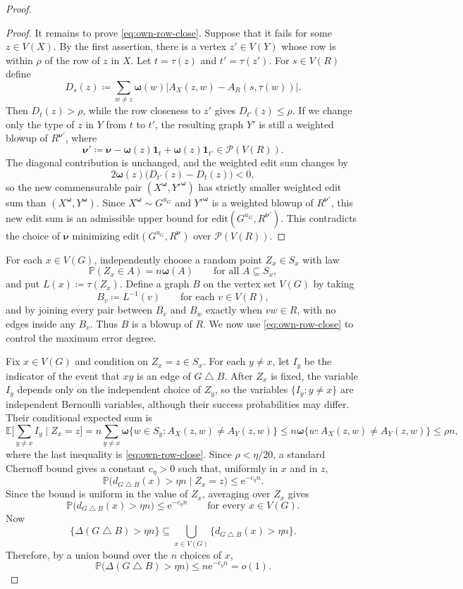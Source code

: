 \documentclass[10pt]{article}
\theoremstyle{plain}
\theoremstyle{remark}
\newcommand{\symdiff}{\mathbin{\triangle}}
\newcommand{\bnu}{{\boldsymbol{\nu}}}
\newcommand{\bomega}{{\boldsymbol{\omega}}}
\begin{document}
\begin{proof}
\begin{proof}
It remains to prove \eqref{eq:own-row-close}. Suppose that it fails for some $z\in V(X)$. By the first assertion, there is a vertex $z'\in V(Y)$ whose row is within $\rho$ of the row of $z$ in $X$. Let $t=\tau(z)$ and $t'=\tau(z')$. For $s\in V(R)$ define
\[
        D_s(z)\coloneqq
        \sum_{w\ne z}\bomega(w)\left|A_X(z,w)-A_R(s,\tau(w))\right|.
\]
Then $D_t(z)>\rho$, while the row closeness to $z'$ gives $D_{t'}(z)\le\rho$. If we change only the type of $z$ in $Y$ from $t$ to $t'$, the resulting graph $Y'$ is still a weighted blowup of $R^{\bnu'}$, where
\[
        \bnu'\coloneqq \bnu-\bomega(z)\mathbf 1_t+\bomega(z)\mathbf 1_{t'}\in\mathcal P(V(R)).
\]
The diagonal contribution is unchanged, and the weighted edit sum changes by
\[
        2\bomega(z)\bigl(D_{t'}(z)-D_t(z)\bigr)<0,
\]
so the new commensurable pair $(X^\bomega,Y'^\bomega)$ has strictly smaller weighted edit sum than $(X^\bomega,Y^\bomega)$. Since $X^\bomega\sim G^{u_G}$ and $Y'^\bomega$ is a weighted blowup of $R^{\bnu'}$, this new edit sum is an admissible upper bound for $\mathrm{edit}(G^{u_G},R^{\bnu'})$. This contradicts the choice of $\bnu$ minimizing $\mathrm{edit}(G^{u_G},R^\bnu)$ over $\mathcal P(V(R))$.
\end{proof}

For each $x\in V(G)$, independently choose a random point $Z_x\in S_x$ with law
\[
        \mathbb P(Z_x\in A)=n\bomega(A)\qquad\text{for all }A\subseteq S_x,
	\]
and put $L(x)\coloneqq\tau(Z_x)$. Define a graph $B$ on the vertex set $V(G)$ by taking
\[
        B_v\coloneqq L^{-1}(v)\qquad\text{for each }v\in V(R),
\]
and by joining every pair between $B_v$ and $B_w$ exactly when $vw\in R$, with no edges inside any $B_v$. Thus $B$ is a blowup of $R$. We now use \eqref{eq:own-row-close} to control the maximum error degree.

Fix $x\in V(G)$ and condition on $Z_x=z\in S_x$. For each $y\ne x$, let $I_y$ be the indicator of the event that $xy$ is an edge of $G\symdiff B$. After $Z_x$ is fixed, the variable $I_y$ depends only on the independent choice of $Z_y$, so the variables $\{I_y:y\ne x\}$ are independent Bernoulli variables, although their success probabilities may differ. Their conditional expected sum is
\[
        \mathbb E\Big[ \sum_{y\ne x}I_y\mid Z_x=z \Big]
        = n\sum_{y\ne x}\bomega\{w\in S_y:A_X(z,w)\ne A_Y(z,w)\}
        \le n\bomega\{w:A_X(z,w)\ne A_Y(z,w)\}
        \le \rho n,
\]
where the last inequality is \eqref{eq:own-row-close}. Since $\rho<\eta/20$, a standard Chernoff bound gives a constant $c_\eta>0$ such that, uniformly in $x$ and in $z$,
\[
        \mathbb P\bigl(d_{G\symdiff B}(x)>\eta n\mid Z_x=z\bigr)
        \le \mathrm{e}^{-c_\eta n}.
\]
Since the bound is uniform in the value of $Z_x$, averaging over $Z_x$ gives
\[
        \mathbb P\bigl(d_{G\symdiff B}(x)>\eta n\bigr)
        \le \mathrm{e}^{-c_\eta n}
        \qquad\text{for every }x\in V(G).
\]
Now
\[
        \{\Delta(G\symdiff B)>\eta n\}
        \subseteq
        \bigcup_{x\in V(G)}
        \{d_{G\symdiff B}(x)>\eta n\}.
\]
Therefore, by a union bound over the $n$ choices of $x$,
\[
        \mathbb P\bigl(\Delta(G\symdiff B)>\eta n\bigr)
        \le n\mathrm{e}^{-c_\eta n}=o(1).
\]


\end{proof}
\end{document}
